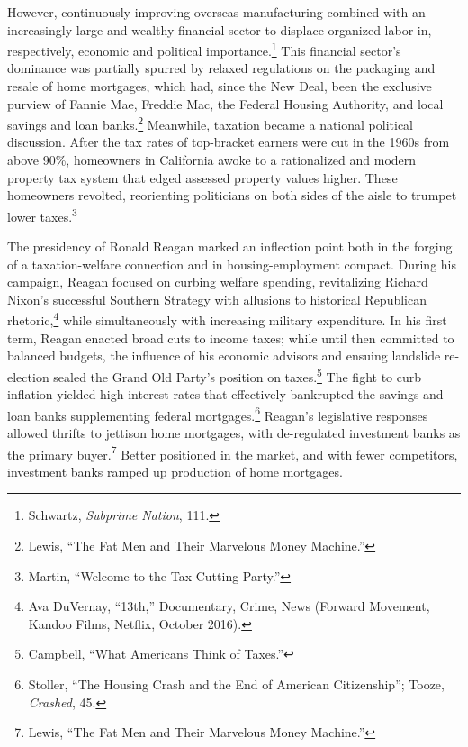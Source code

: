 \documentclass[12pt,oneside]{psthesis}
\begin{document}
However, continuously-improving overseas manufacturing combined with an increasingly-large and wealthy financial sector to displace organized labor in, respectively, economic and political importance.\footnote{Schwartz, \emph{Subprime Nation}, 111.}
This financial sector's dominance was partially spurred by relaxed regulations on the packaging and resale of home mortgages, which had, since the New Deal, been the exclusive purview of Fannie Mae, Freddie Mac, the Federal Housing Authority, and local savings and loan banks.\footnote{Lewis, ``The Fat Men and Their Marvelous Money Machine.''}
Meanwhile, taxation became a national political discussion.
After the tax rates of top-bracket earners were cut in the 1960s from above 90\%, homeowners in California awoke to a rationalized and modern property tax system that edged assessed property values higher.
These homeowners revolted, reorienting politicians on both sides of the aisle to trumpet lower taxes.\footnote{Martin, ``Welcome to the Tax Cutting Party.''}

The presidency of Ronald Reagan marked an inflection point both in the forging of a taxation-welfare connection and in housing-employment compact.
During his campaign, Reagan focused on curbing welfare spending, revitalizing Richard Nixon's successful Southern Strategy with allusions to historical Republican rhetoric,\footnote{Ava DuVernay, ``13th,'' Documentary, Crime, News (Forward Movement, Kandoo Films, Netflix, October 2016).} while simultaneously with increasing military expenditure.
In his first term, Reagan enacted broad cuts to income taxes; while until then committed to balanced budgets, the influence of his economic advisors and ensuing landslide re-election sealed the Grand Old Party's position on taxes.\footnote{Campbell, ``What Americans Think of Taxes.''}
The fight to curb inflation yielded high interest rates that effectively bankrupted the savings and loan banks supplementing federal mortgages.\footnote{Stoller, ``The Housing Crash and the End of American Citizenship''; Tooze, \emph{Crashed}, 45.}
Reagan's legislative responses allowed thrifts to jettison home mortgages, with de-regulated investment banks as the primary buyer.\footnote{Lewis, ``The Fat Men and Their Marvelous Money Machine.''}
Better positioned in the market, and with fewer competitors, investment banks ramped up production of home mortgages.
\end{document}
